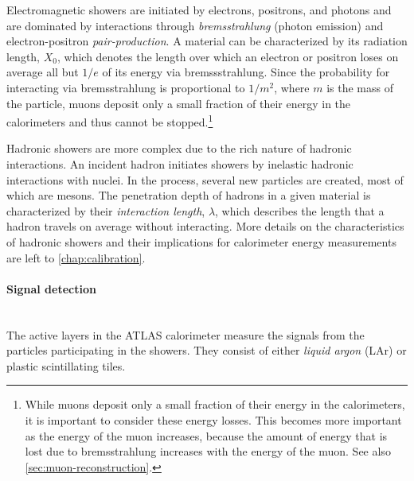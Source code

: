Electromagnetic showers are initiated by electrons, positrons, and photons and are dominated by interactions through \emph{bremsstrahlung} (photon emission) and electron-positron \emph{pair-production}.
A material can be characterized by its radiation length, $X_0$, which denotes the length over which an electron or positron loses on average all but  $1/e$ of its energy via bremssstrahlung. Since the probability for interacting via bremsstrahlung is proportional to $1 / m^2$, where $m$ is the mass of the particle, muons deposit only a small fraction of their energy in the calorimeters and thus cannot be stopped.\footnote{While muons deposit only a small fraction of their energy in the calorimeters, it is important to consider these energy losses. This becomes more important as the energy of the muon increases, because the amount of energy that is lost due to bremsstrahlung increases with the energy of the muon. See also \cref{sec:muon-reconstruction}.}

Hadronic showers are more complex due to the rich nature of hadronic interactions. An incident hadron initiates showers by inelastic hadronic interactions with nuclei. In the process, several new particles are created, most of which are mesons.
The penetration depth of hadrons in a given material is characterized by their \emph{interaction length}, $\lambda$, which describes the length that a hadron travels on average without interacting.
More details on the characteristics of hadronic showers and their implications for calorimeter energy measurements are left to \cref{chap:calibration}.

\paragraph{Signal detection}\mbox{}\\
The active layers in the ATLAS calorimeter measure the signals from the particles participating in the showers. They consist of either \emph{liquid argon} (LAr) or plastic scintillating tiles.

